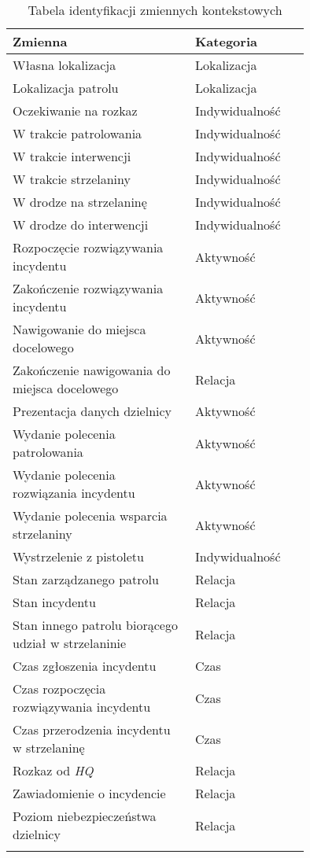 \begin{longtable}{|p{0.5\linewidth}|p{0.25\linewidth}|}
    \hline
     Zmienna & Kategoria \\
     \hline
     \hline
     Własna lokalizacja & Lokalizacja \\
     \hline
     Lokalizacja patrolu & Lokalizacja \\
     \hline
     Oczekiwanie na rozkaz & Indywidualność \\
     \hline
     W trakcie patrolowania & Indywidualność \\
     \hline
     W trakcie interwencji & Indywidualność \\
     \hline
     W trakcie strzelaniny & Indywidualność \\
     \hline
     W drodze na strzelaninę & Indywidualność \\
     \hline
     W drodze do interwencji & Indywidualność \\
     \hline
     Rozpoczęcie rozwiązywania incydentu & Aktywność \\
     \hline
     Zakończenie rozwiązywania incydentu & Aktywność \\
     \hline
     Nawigowanie do miejsca docelowego & Aktywność \\
     \hline
     Zakończenie nawigowania do miejsca docelowego & Relacja \\
     \hline
     Prezentacja danych dzielnicy & Aktywność \\
     \hline
     Wydanie polecenia patrolowania & Aktywność \\
     \hline
     Wydanie polecenia rozwiązania incydentu & Aktywność \\
     \hline
     Wydanie polecenia wsparcia strzelaniny & Aktywność \\
     \hline
     Wystrzelenie z pistoletu & Indywidualność \\
     \hline
     Stan zarządzanego patrolu & Relacja \\
     \hline
     Stan incydentu & Relacja \\
     \hline
     Stan innego patrolu biorącego udział w strzelaninie & Relacja \\
     \hline
     Czas zgłoszenia incydentu & Czas \\
     \hline
     Czas rozpoczęcia rozwiązywania incydentu & Czas \\
     \hline
      Czas przerodzenia incydentu w strzelaninę & Czas \\
     \hline
      Rozkaz od \emph{HQ} & Relacja \\
     \hline
     Zawiadomienie o incydencie & Relacja \\
     \hline
     Poziom niebezpieczeństwa dzielnicy & Relacja \\
     \hline
\caption{Tabela identyfikacji zmiennych kontekstowych}
\label{tab:agentsFeaturesCategorization}
\end{longtable}

